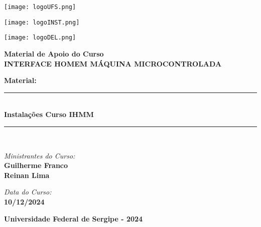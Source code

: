 \documentclass[a4paper,12pt]{report}
\begin{document}
\begin{titlepage}
\begin{center}


\begin{minipage}{2cm}
    \centering
    \texttt{[image: logoUFS.png]}
\end{minipage}
\hfill
\begin{minipage}{11cm}
    \centering
    \texttt{[image: logoINST.png]}
\end{minipage}
\hfill
\begin{minipage}{3cm}
    \centering
    \texttt{[image: logoDEL.png]}
\end{minipage}



\vspace{2cm}

{\large \bfseries Material de Apoio do Curso}\\[0.5cm]
{\huge \bfseries INTERFACE HOMEM MÁQUINA MICROCONTROLADA} \\[0.5cm]

\vspace{2.5cm}

{\large \bfseries Material:}\\[0.5cm]
\rule{\linewidth}{0.3mm} \\[0.6cm]
{\huge \bfseries \color{blue} Instalações Curso IHMM} \\[0.2cm]
\rule{\linewidth}{0.3mm} \\[2cm]

\noindent
\begin{minipage}{0.4\textwidth}
    \begin{flushleft} \large
        \emph{Ministrantes do Curso:}\\
        \textbf{Guilherme Franco} \\
        \textbf{Reinan Lima}
    \end{flushleft}
\end{minipage}%
\begin{minipage}{0.6\textwidth}
    \begin{flushright} \large
        \emph{Data do Curso:}\\
        \textbf{10/12/2024}
    \end{flushright}
\end{minipage}

\vfill

{\textbf{\large Universidade Federal de Sergipe - 2024}}

\end{center}
\end{titlepage}
\end{document}
